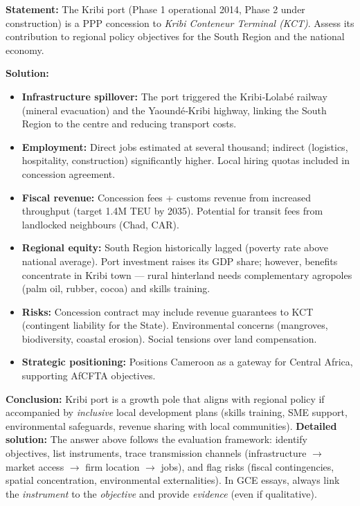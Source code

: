 \documentclass[11pt]{article}
\newcommand{\cle}[1]{{\popxbold\color{popdark}#1}}
\begin{document}
\begin{exoresolu}
\textbf{Statement:} The Kribi port (Phase 1 operational 2014, Phase 2 under construction) is a PPP concession to \emph{Kribi Conteneur Terminal (KCT)}.  Assess its contribution to regional policy objectives for the South Region and the national economy.

\textbf{Solution:}
\begin{itemize}
    \item \textbf{Infrastructure spillover:} The port triggered the Kribi‑Lolabé railway (mineral evacuation) and the Yaoundé‑Kribi highway, linking the South Region to the centre and reducing transport costs.
    \item \textbf{Employment:} Direct jobs estimated at several thousand; indirect (logistics, hospitality, construction) significantly higher.  Local hiring quotas included in concession agreement.
    \item \textbf{Fiscal revenue:} Concession fees + customs revenue from increased throughput (target 1.4M TEU by 2035).  Potential for transit fees from landlocked neighbours (Chad, CAR).
    \item \textbf{Regional equity:} South Region historically lagged (poverty rate above national average).  Port investment raises its GDP share; however, benefits concentrate in Kribi town — rural hinterland needs complementary agropoles (palm oil, rubber, cocoa) and skills training.
    \item \textbf{Risks:} Concession contract may include revenue guarantees to KCT (contingent liability for the State).  Environmental concerns (mangroves, biodiversity, coastal erosion).  Social tensions over land compensation.
    \item \textbf{Strategic positioning:} Positions Cameroon as a gateway for Central Africa, supporting AfCFTA objectives.
\end{itemize}
\textbf{Conclusion:} Kribi port is a \cle{growth pole} that aligns with regional policy if accompanied by \emph{inclusive} local development plans (skills training, SME support, environmental safeguards, revenue sharing with local communities).
\tcblower
\textbf{Detailed solution:} The answer above follows the evaluation framework: identify objectives, list instruments, trace transmission channels (infrastructure $\rightarrow$ market access $\rightarrow$ firm location $\rightarrow$ jobs), and flag risks (fiscal contingencies, spatial concentration, environmental externalities).  In GCE essays, always link the \emph{instrument} to the \emph{objective} and provide \emph{evidence} (even if qualitative).
\end{exoresolu}
\end{document}
